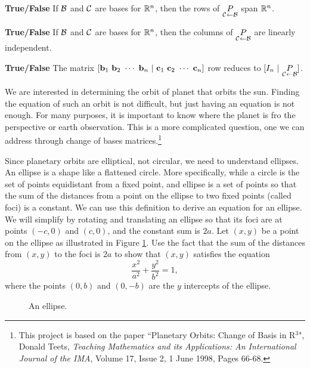 \item \textbf{True/False} If $\mathcal{B}$ and $\mathcal{C}$ are bases for $\mathbb{R}^n$, then the rows of $\underset{\mathcal{C} \leftarrow \mathcal{B}}{P}$ span $\mathbb{R}^n$. 

\item \textbf{True/False} If $\mathcal{B}$ and $\mathcal{C}$ are bases for $\mathbb{R}^n$, then the columns of $\underset{\mathcal{C} \leftarrow \mathcal{B}}{P}$ are linearly independent.  

\item \textbf{True/False} The matrix $[\mathbf{b}_1 \ \mathbf{b}_2 \ \cdots \ \mathbf{b}_n \ | \ \mathbf{c}_1 \ \mathbf{c}_2 \ \cdots \ \mathbf{c}_n]$ row reduces to $[I_n \ | \ \underset{\mathcal{C} \leftarrow \mathcal{B}}{P}]$. 

\ea


\ee


We are interested in determining the orbit of planet that orbits the sun. Finding the equation of such an orbit is not difficult, but just having an equation is not enough. For many purposes, it is important to know where the planet is fro the perspective or earth observation. This is a more complicated question, one we can address through change of bases matrices.\footnote{This project is based on the paper ``Planetary Orbits: Change of Basis in R$^3$", Donald Teets,  \emph{Teaching Mathematics and its Applications: An International Journal of the IMA}, Volume 17, Issue 2, 1 June 1998, Pages 66-68.}

\begin{pactivity} \label{act:orbits_ellipse} Since planetary orbits are elliptical, not circular, we need to understand ellipses.  An ellipse is a shape like a flattened circle. More specifically, while a circle is the set of points equidistant from a fixed point, and ellipse is a set of points so that the sum of the distances from a point on the ellipse to two fixed points (called foci) is a constant. We can use this definition to derive an equation for an ellipse. We will simplify by rotating and translating an ellipse so that its foci are at points $(-c,0)$ and $(c,0)$, and the constant sum is $2a$. Let $(x,y)$ be a point on the ellipse as illustrated in Figure \ref{F:ellipse}. Use the fact that the sum of the distances from $(x,y)$ to the foci is $2a$ to show that $(x,y)$ satisfies the equation  
\begin{equation} \label{eq:orbit_ellipse} 
\frac{x^2}{a^2} + \frac{y^2}{b^2} = 1,
\end{equation} 
where the points $(0,b)$ and $(0,-b)$ are the $y$ intercepts of the ellipse. 
\begin{figure}[h]
\begin{center}
\end{center}
\caption{An ellipse.}
\label{F:ellipse}
\end{figure}


\end{pactivity}


